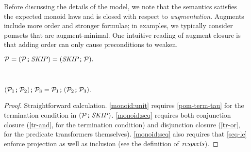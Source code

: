 Before discussing the details of the model, we note that the semantics
satisfies the expected monoid laws and is closed with respect to
\emph{augmentation}.  Augments include more order and stronger formulae; in
examples, we typically consider pomsets that are augment-minimal.  One
intuitive reading of augment closure is that adding order can only cause
preconditions to weaken.
\begin{lemma}
  \label{lem:monoid}
  
  \begin{enumerate*}[label=(\alph*),ref=\alph*]
  \item \label{monoid:unit}
    \begin{math}
      \mathcal{P}
      =
      ({\mathcal{P}}\texttt{;}\,\allowbreak{\textnormal{\textit{SKIP}}})
      =
      ({\textnormal{\textit{SKIP}}}\texttt{;}\,\allowbreak{\mathcal{P}}).
    \end{math}


  \\\item \label{monoid:seq}
    \begin{math}
      {({\mathcal{P}_1}\texttt{;}\,\allowbreak{\mathcal{P}_2})}\texttt{;}\,\allowbreak{\mathcal{P}_3}
      =
      {\mathcal{P}_1}\texttt{;}\,\allowbreak{({\mathcal{P}_2}\texttt{;}\,\allowbreak{\mathcal{P}_3})}.
    \end{math}

  \end{enumerate*}      
  \vspace{-.5\baselineskip}
  \begin{proof}
    Straightforward calculation.
    \eqref{monoid:unit} requires \ref{pom-term-tau} for
    the termination condition in $({\mathcal{P}}\texttt{;}\,\allowbreak{\textnormal{\textit{SKIP}}})$.
    \eqref{monoid:seq} requires both
    conjunction closure (\ref{tr-and}, for the termination condition) and disjunction
    closure (\ref{tr-or}, for the predicate transformers themselves).
    \eqref{monoid:seq} also requires that \ref{seq-le} enforce projection as
    well as inclusion (see the definition of $\rextendsdef{}{}$).
  \end{proof}
\end{lemma}
